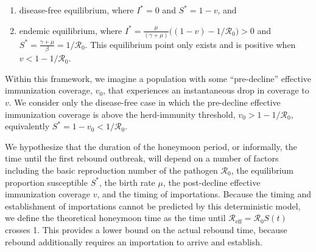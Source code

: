 \documentclass[12pt]{article}
\newcommand{\Rn}{{\mathcal R}_0}
\newcommand{\Reff}{{\mathcal R}_{\textrm{eff}}}
\begin{document}
\begin{enumerate}
    \item disease-free equilibrium, where $I^* = 0$ and $S^* = 1-v$, and
    \item endemic equilibrium, where $I^* = \frac{\mu}{(\gamma + \mu)} \big((1-v) - 1/\Rn\big) > 0$ and $S^* = \frac{\gamma + \mu}{\beta} = 1/\Rn$. This equilibrium point only exists and is positive when $v < 1-1/\Rn$.
\end{enumerate}

Within this framework, we imagine a population with some ``pre-decline'' effective immunization coverage, $v_0$, that experiences an instantaneous drop in coverage to $v$. We consider only the disease-free case in which the pre-decline effective immunization coverage is above the herd-immunity threshold, $v_0>1-1/\Rn$, equivalently $S^*=1-v_0<1/\Rn$.

We hypothesize that the duration of the honeymoon period, or informally, the time until the first rebound outbreak, will depend on a number of factors including the basic reproduction number of the pathogen $\Rn$, the equilibrium proportion susceptible $S^*$, the birth rate $\mu$, the post-decline effective immunization coverage $v$, and the timing of importations. Because the timing and establishment of importations cannot be predicted by this deterministic model, we define the theoretical honeymoon time as the time until $\Reff=\Rn S(t)$ crosses 1. This provides a lower bound on the actual rebound time, because rebound additionally requires an importation to arrive and establish.
\end{document}
